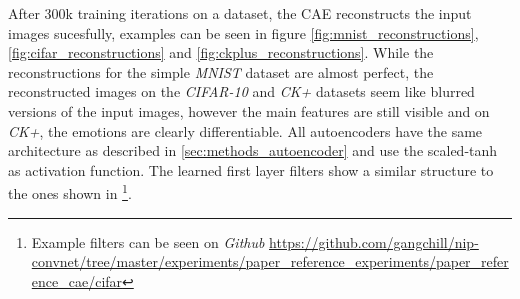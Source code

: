 \documentclass{article}
\begin{document}
    After 300k training iterations on a dataset, the CAE reconstructs the input images sucesfully, examples can be seen in figure \ref{fig:mnist_reconstructions}, \ref{fig:cifar_reconstructions} and \ref{fig:ckplus_reconstructions}. While the reconstructions for the simple \emph{MNIST} dataset are almost perfect, the reconstructed images on the \emph{CIFAR-10} and \emph{CK+} datasets seem like blurred versions of the input images, however the main features are still visible and on \emph{CK+}, the emotions are clearly differentiable. All autoencoders have the same architecture as described in \ref{sec:methods_autoencoder} and use the scaled-tanh as activation function. The learned first layer filters show a similar structure to the ones shown in \citep{masci2011stacked}\footnote{Example filters can be seen on \emph{Github} \url{https://github.com/gangchill/nip-convnet/tree/master/experiments/paper_reference_experiments/paper_reference_cae/cifar}}. 
\end{document}
